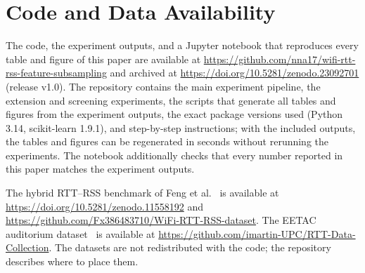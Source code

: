 \section*{Code and Data Availability}

The code, the experiment outputs, and a Jupyter notebook that reproduces every table and figure of this paper are available at \url{https://github.com/nna17/wifi-rtt-rss-feature-subsampling} and archived at \url{https://doi.org/10.5281/zenodo.23092701} (release v1.0). The repository contains the main experiment pipeline, the extension and screening experiments, the scripts that generate all tables and figures from the experiment outputs, the exact package versions used (Python 3.14, scikit-learn 1.9.1), and step-by-step instructions; with the included outputs, the tables and figures can be regenerated in seconds without rerunning the experiments. The notebook additionally checks that every number reported in this paper matches the experiment outputs.

The hybrid RTT--RSS benchmark of Feng et al.~\cite{feng2026robust} is available at \url{https://doi.org/10.5281/zenodo.11558192} and \url{https://github.com/Fx386483710/WiFi-RTT-RSS-dataset}. The EETAC auditorium dataset~\cite{martinescalona2023ftm} is available at \url{https://github.com/imartin-UPC/RTT-Data-Collection}. The datasets are not redistributed with the code; the repository describes where to place them.
